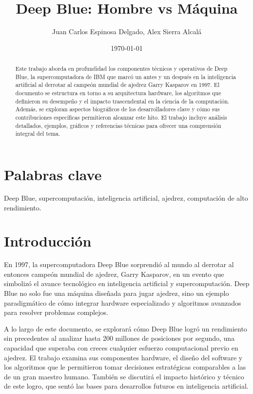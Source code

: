 \documentclass[12pt,a4paper]{article}
\title{Deep Blue: Hombre vs Máquina}
\author{Juan Carlos Espinosa Delgado, Alex Sierra Alcalá}
\date{\today}
\begin{document}
\maketitle

\begin{abstract}
Este trabajo aborda en profundidad los componentes técnicos y operativos de Deep Blue, la supercomputadora de IBM que marcó un antes y un después en la inteligencia artificial al derrotar al campeón mundial de ajedrez Garry Kasparov en 1997. El documento se estructura en torno a su arquitectura hardware, los algoritmos que definieron su desempeño y el impacto trascendental en la ciencia de la computación. Además, se exploran aspectos biográficos de los desarrolladores clave y cómo sus contribuciones específicas permitieron alcanzar este hito. El trabajo incluye análisis detallados, ejemplos, gráficos y referencias técnicas para ofrecer una comprensión integral del tema.
\end{abstract}

\section*{Palabras clave}
Deep Blue, supercomputación, inteligencia artificial, ajedrez, computación de alto rendimiento.

\section{Introducción}
En 1997, la supercomputadora Deep Blue sorprendió al mundo al derrotar al entonces campeón mundial de ajedrez, Garry Kasparov, en un evento que simbolizó el avance tecnológico en inteligencia artificial y supercomputación. Deep Blue no solo fue una máquina diseñada para jugar ajedrez, sino un ejemplo paradigmático de cómo integrar hardware especializado y algoritmos avanzados para resolver problemas complejos. 

A lo largo de este documento, se explorará cómo Deep Blue logró un rendimiento sin precedentes al analizar hasta 200 millones de posiciones por segundo, una capacidad que superaba con creces cualquier esfuerzo computacional previo en ajedrez. El trabajo examina sus componentes hardware, el diseño del software y los algoritmos que le permitieron tomar decisiones estratégicas comparables a las de un gran maestro humano. También se discutirá el impacto histórico y técnico de este logro, que sentó las bases para desarrollos futuros en inteligencia artificial.
\end{document}
